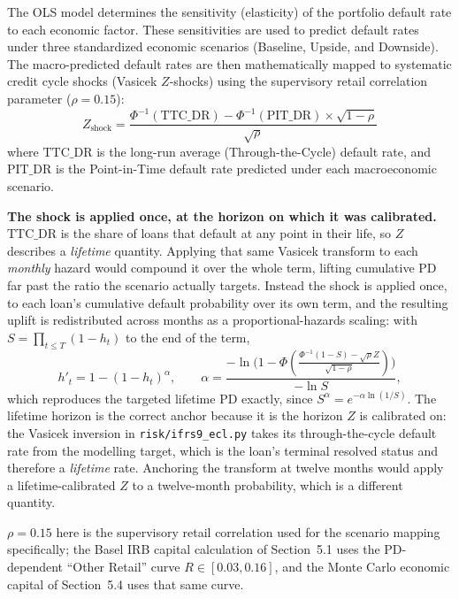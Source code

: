 \documentclass[11pt,a4paper]{article}
\begin{document}
The OLS model determines the sensitivity (elasticity) of the portfolio default rate to each economic factor. These sensitivities are used to predict default rates under three standardized economic scenarios (Baseline, Upside, and Downside). The macro-predicted default rates are then mathematically mapped to systematic credit cycle shocks (Vasicek $Z$-shocks) using the supervisory retail correlation parameter ($\rho = 0.15$):
\begin{equation}
Z_{\text{shock}} = \frac{\Phi^{-1}(\text{TTC\_DR}) - \Phi^{-1}(\text{PIT\_DR}) \times \sqrt{1 - \rho}}{\sqrt{\rho}}
\end{equation}
where $\text{TTC\_DR}$ is the long-run average (Through-the-Cycle) default rate, and $\text{PIT\_DR}$ is the Point-in-Time default rate predicted under each macroeconomic scenario.

\textbf{The shock is applied once, at the horizon on which it was calibrated.} $\text{TTC\_DR}$ is the share of loans that default at any point in their life, so $Z$ describes a \emph{lifetime} quantity. Applying that same Vasicek transform to each \emph{monthly} hazard would compound it over the whole term, lifting cumulative PD far past the ratio the scenario actually targets. Instead the shock is applied once, to each loan's cumulative default probability over its own term, and the resulting uplift is redistributed across months as a proportional-hazards scaling: with $S = \prod_{t \le T}(1 - h_t)$ to the end of the term,
\begin{equation}
h'_t = 1 - (1 - h_t)^{\alpha}, \qquad
\alpha = \frac{-\ln\!\big(1 - \Phi(\tfrac{\Phi^{-1}(1-S) - \sqrt{\rho} Z}{\sqrt{1-\rho}})\big)}{-\ln S},
\end{equation}
which reproduces the targeted lifetime PD exactly, since $S^{\alpha} = e^{-\alpha \ln(1/S)}$. The lifetime horizon is the correct anchor because it is the horizon $Z$ is calibrated on: the Vasicek inversion in \texttt{risk/ifrs9\_ecl.py} takes its through-the-cycle default rate from the modelling target, which is the loan's terminal resolved status and therefore a \emph{lifetime} rate. Anchoring the transform at twelve months would apply a lifetime-calibrated $Z$ to a twelve-month probability, which is a different quantity.

$\rho = 0.15$ here is the supervisory retail correlation used for the scenario mapping specifically; the Basel IRB capital calculation of Section~5.1 uses the PD-dependent ``Other Retail'' curve $R \in [0.03, 0.16]$, and the Monte Carlo economic capital of Section~5.4 uses that same curve.
\end{document}
